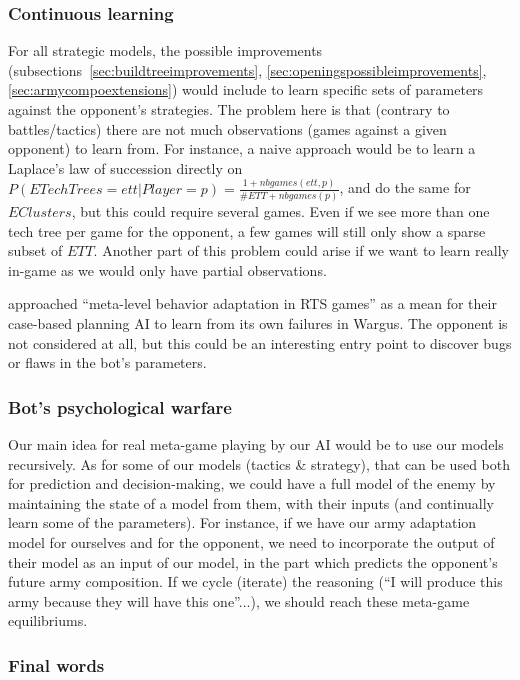 \subsubsection{Continuous learning}

For all strategic models, the possible improvements (subsections~\ref{sec:buildtreeimprovements}, \ref{sec:openingspossibleimprovements}, \ref{sec:armycompoextensions}) would include to learn specific sets of parameters against the opponent's strategies. The problem here is that (contrary to battles/tactics) there are not much observations (games against a given opponent) to learn from. For instance, a naive approach would be to learn a Laplace's law of succession directly on $P(ETechTrees=ett|Player=p)= \frac{1 + nbgames(ett,p)}{\#ETT + nbgames(p)}$, and do the same for $EClusters$, but this could require several games. Even if we see more than one tech tree per game for the opponent, a few games will still only show a sparse subset of $ETT$. Another part of this problem could arise if we want to learn really in-game as we would only have partial observations. %

\cite{metalevelbehavioradaptrts} approached ``meta-level behavior adaptation in RTS games'' as a mean for their case-based planning AI to learn from its own failures in Wargus. The opponent is not considered at all, but this could be an interesting entry point to discover bugs or flaws in the bot's parameters.

\subsubsection{Bot's psychological warfare}

Our main idea for real meta-game playing by our AI would be to use our models recursively. As for some of our models (tactics \& strategy), that can be used both for prediction and decision-making, we could have a full model of the enemy by maintaining the state of a model from them, with their inputs (and continually learn some of the parameters). For instance, if we have our army adaptation model for ourselves and for the opponent, we need to incorporate the output of their model as an input of our model, in the part which predicts the opponent's future army composition. If we cycle (iterate) the reasoning (``I will produce this army because they will have this one''...), we should reach these meta-game equilibriums.


\subsubsection{Final words}

